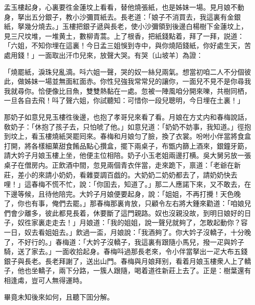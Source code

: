 孟玉樓起身，心裏要徃金蓮坟上看看，替他燒張紙，也是姊妹一場。見月娘不動身，拏出五分銀子，教小沙彌買紙去。長老道：「娘子不消買去，我這裏有金銀紙，拏幾分燒去。」玉樓把銀子遞與長老，使小沙彌領到後邊白楊樹下金蓮坟上，見三尺坟堆，一堆黄土，數柳青蒿。上了根香，把紙錢點着，拜了一拜，説道：「六姐，不知你埋在這裏！今日孟三姐悞到寺中，與你燒陌錢紙，你好處生天，苦處用錢！」一面取出汗巾兒來，放聲大哭。有哭〔山坡羊〕為證：

\begin{myquote}
「燒罷紙，淚珠兒亂滴。呌六姐一聲，哭的奴一絲兒兩氣。想當初咱二人不分個彼此，做姊妹一場並無面紅面赤。你性兒強我常常兒的讓你，一面兒不見不是你尋我我就尋你。恰便像比目魚，雙雙熱黏在一處。忽被一陣風咱分開來嚛，共樹同栖，一旦各自去飛！呌了聲六姐，你試聽知：可惜你一段兒聰明，今日埋在土裏！」
\end{myquote}

那奶子如意兒見玉樓徃後邊，也抱了孝哥兒來看了看。月娘在方丈内和春梅說話，敎奶子：「休抱了孩子去，只怕唬了他。」如意兒道：「奶奶不妨事，我知道。」徑抱到坟上，看玉樓燒紙哭罷囘來。春梅和月娘匀了臉，換了衣裳。吩咐小伴當將食盒打開，將各樣細菓甜食餚品點心攢盒，擺下兩桌子，布甑内篩上酒來，銀鐘牙筯，請大妗子月娘玉樓上坐，他便主位相陪。奶子小玉老姐兩邊打横。吳大舅另放一張桌子在僧房内。正飲酒中間，忽見兩個青衣伴當，走來跪下，禀道：「老爺在新莊，差小的來請小奶奶，看雜耍調百戯的。大奶奶二奶奶都去了，請奶奶快去哩！」這春梅不慌不忙，說：「你囬去，知道了。」那二人應諾下來，又不敢去，在下邊等候，且待他陪完。大妗子月娘便要起身，說：「姐姐，不再打攪！天色晚了，你也有事，俺們去罷。」那春梅那裏肯放，只顧令左右將大鍾來勸道：「咱娘兒們會少離多，彼此都見長着，休要斷了這門親路。奴也沒親没故，到明日娘好的日子，奴徃家裏走走去！」月娘道：「我的姐姐，說一聲兒就夠了，怎敢起動你？容一日，奴去看姐姐去。」飲過一盃，月娘說：「我酒夠了。你大妗子沒轎子，十分晚了，不好行的。」春梅道：「大妗子沒轎子，我這裏有跟隨小馬兒，撥一疋與妗子騎，送了家去。」一面收拾起身。春梅呌過那長老來，令小伴當拏出一疋大布五錢銀子與長老。長老拜謝了，送出山門。春梅與月娘拜别，看着月娘玉樓衆人上了轎子，他也坐轎子，兩下分路，一簇人跟隨，喝着道徃新莊上去了。正是：樹葉還有相逢䖏，豈可人無得運時。

畢竟未知後來如何，且聽下囬分解。

